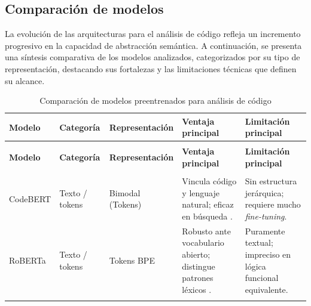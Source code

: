 \subsection{Comparación de modelos}

La evolución de las arquitecturas para el análisis de código refleja un incremento progresivo en la capacidad de abstracción semántica. A continuación, se presenta una síntesis comparativa de los modelos analizados, categorizados por su tipo de representación, destacando sus fortalezas y las limitaciones técnicas que definen su alcance.

{ %
\renewcommand{\arraystretch}{1.5}
\small

\begin{xltabular}{\textwidth}{>{\raggedright\arraybackslash}p{2.5cm} >{\raggedright\arraybackslash}p{2.2cm} >{\raggedright\arraybackslash}p{2.8cm} >{\raggedright\arraybackslash}X >{\raggedright\arraybackslash}X}
    \caption{Comparación de modelos preentrenados para análisis de código} \label{tab:modelos} \\
    
    \toprule
    \textbf{Modelo} & \textbf{Categoría} & \textbf{Representación} & \textbf{Ventaja principal} & \textbf{Limitación principal} \\
    \midrule
    \endfirsthead

     \\
    \toprule
    \textbf{Modelo} & \textbf{Categoría} & \textbf{Representación} & \textbf{Ventaja principal} & \textbf{Limitación principal} \\
    \midrule
    \endhead %

    \midrule
     \\
    \endfoot

    \bottomrule
    \endlastfoot

    CodeBERT & Texto / tokens & Bimodal (Tokens) & Vincula código y lenguaje natural; eficaz en búsqueda \cite{Feng2020CodeBERT}. & Sin estructura jerárquica; requiere mucho \textit{fine-tuning}. \\
    \addlinespace
    
    RoBERTa & Texto / tokens & Tokens BPE & Robusto ante vocabulario abierto; distingue patrones léxicos \cite{Liu2019RoBERTa}. & Puramente textual; impreciso en lógica funcional equivalente. \\
    \addlinespace
    

\end{xltabular}}
